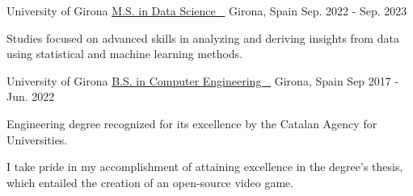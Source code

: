 

\begin{cventries}

  \cventry
    {University of Girona} %
    {\href{https://1drv.ms/b/s!AkpkVWgTjVvhg75Ia949k6hMR4yAdQ?e=RifsPu}{M.S. in Data Science \ {\scriptsize \faLink}}} %
    {Girona, Spain} %
    {Sep. 2022 - Sep. 2023} %
    {
      \begin{cvitems} %
      \item {
      Studies focused on advanced skills in analyzing and deriving insights from data using statistical and machine learning methods.
      }
      \end{cvitems}
    }

    \cventry
    {University of Girona} %
    {\href{https://1drv.ms/b/s!AkpkVWgTjVvhg74LnMHf7OWtWJlmrg?e=gcWA80}{B.S. in Computer Engineering \ {\scriptsize \faLink}}} %
    {Girona, Spain} %
    {Sep 2017 - Jun. 2022} %
    {
      \begin{cvitems} %
        \item {Engineering degree recognized for its excellence by the Catalan Agency for Universities.}
        \item {I take pride in my accomplishment of attaining excellence in the degree's thesis, which entailed the creation of an open-source video game.
}
      \end{cvitems}
    }

\end{cventries}
